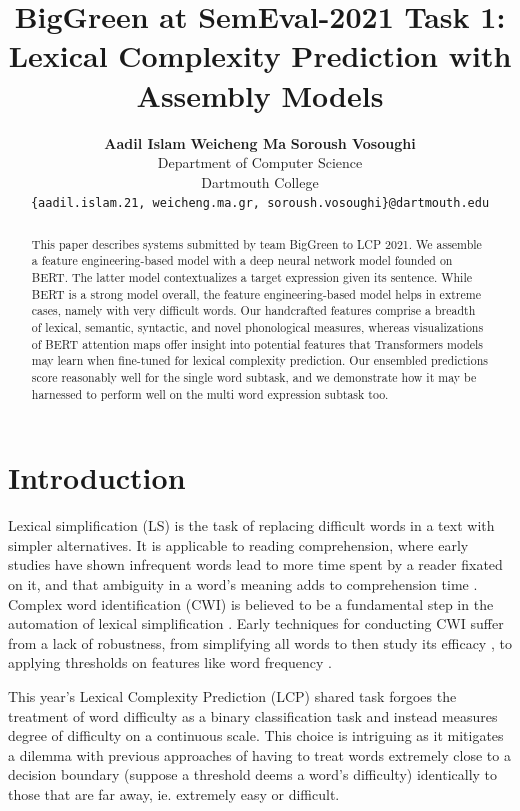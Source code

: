 \documentclass[11pt,a4paper]{article}
\title{BigGreen at SemEval-2021 Task 1: \\
Lexical Complexity Prediction with Assembly Models}
\author{
  \textbf{Aadil Islam}\normalfont{,} \textbf{Weicheng Ma}\normalfont{, and} \textbf{Soroush Vosoughi}\\
  Department of Computer Science\\
  Dartmouth College\\
  \texttt{\{aadil.islam.21, weicheng.ma.gr, soroush.vosoughi\}@dartmouth.edu}
}
\date{}
\begin{document}
\maketitle

\begin{abstract}
  This paper describes systems submitted by team BigGreen to LCP 2021. We assemble a feature engineering-based model with a deep neural network model founded on BERT. The latter model contextualizes a target expression given its sentence. While BERT is a strong model overall, the feature engineering-based model helps in extreme cases, namely with very difficult words. Our handcrafted features comprise a breadth of lexical, semantic, syntactic, and novel phonological measures, whereas visualizations of BERT attention maps offer insight into potential features that Transformers models may learn when fine-tuned for lexical complexity prediction. Our ensembled predictions score reasonably well for the single word subtask, and we demonstrate how it may be harnessed to perform well on the multi word expression subtask too.
\end{abstract}

\section{Introduction}

Lexical simplification (LS) is the task of replacing difficult words in a text with simpler alternatives. It is applicable to reading comprehension, where early studies have shown infrequent words lead to more time spent by a reader fixated on it, and that ambiguity in a word's meaning adds to comprehension time \citep{raynerd86}. Complex word identification (CWI) is believed to be a fundamental step in the automation of lexical simplification \citep{shardlow2014open}. Early techniques for conducting CWI suffer from a lack of robustness, from simplifying all words to then study its efficacy \citep{devlintait}, to applying thresholds on features like word frequency \citep{10.1007/11573067_19}. 

This year's Lexical Complexity Prediction (LCP) shared task \citep{shardlow2020complex} forgoes the treatment of word difficulty as a binary classification task \citep{paetzoldspecia:2016:SemEval1, stajner-EtAl:2018:BEA} and instead measures degree of difficulty on a continuous scale. This choice is intriguing as it mitigates a dilemma with previous approaches of having to treat words extremely close to a decision boundary (suppose a threshold deems a word's difficulty) identically to those that are far away, ie. extremely easy or difficult.
\end{document}

